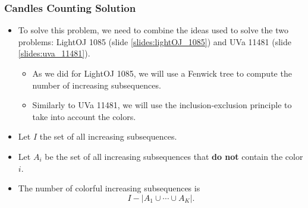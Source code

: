 \documentclass{beamer}
\newcommand{\hackerranklink}[2]{HackerRank (https://www.hackerrank.com)
  problem: \href{#2}{\textcolor{blue}{#1}.}}
\newcommand{\hint}[1]{
\begin{bclogo}[arrondi=0.1, logo=\bclampe]{Hint}
#1
\end{bclogo}
}
\newcounter{exo}
\newcommand{\exo}{
  \addtocounter{exo}{1}
  Exercice \arabic{exo}
}
\begin{document}
\fi


\ifanswers

\begin{frame}%
\frametitle{Candles Counting Solution}

\begin{itemize}

\item To solve this problem, we need to combine the ideas used to solve
the two problems: LightOJ 1085 (slide \ref{slides:lightOJ_1085}) and UVa 11481 (slide \ref{slides:uva_11481}).
\begin{itemize}
\item<2-> As we did for LightOJ 1085, we will use a Fenwick tree to compute the number of increasing subsequences.
\vspace{0.08cm}
\item<3-> Similarly to UVa 11481, we will use the inclusion-exclusion principle to take into account the colors.
\end{itemize}

\vspace{0.2cm}

\item<4-> Let $I$ the set of all increasing subsequences.

\vspace{0.2cm}

\item<5-> Let $A_i$ be the set of all increasing subsequences that \textbf{do not} contain the color $i$.

\vspace{0.2cm}

\item<6-> The number of colorful increasing subsequences is
$$
I - |A_1 \cup \cdots \cup A_K|.
$$

\end{itemize}


\end{frame}
\end{document}
